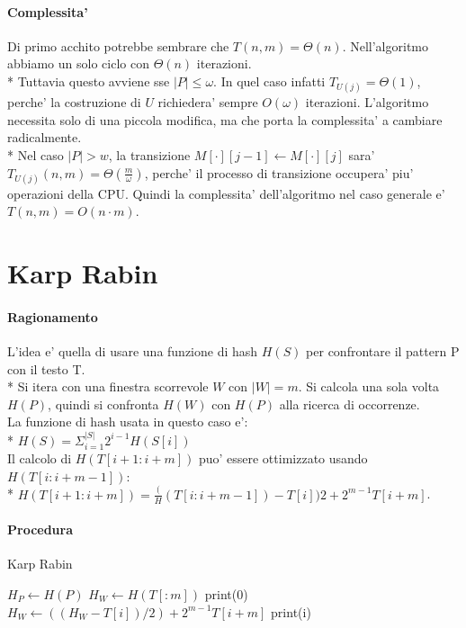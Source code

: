 \pagebreak

\paragraph{Complessita'}

Di primo acchito potrebbe sembrare che $T(n, m) = \Theta(n)$.
Nell'algoritmo abbiamo un solo ciclo con $\Theta(n)$ iterazioni. \\*
Tuttavia questo avviene sse $|P| \leq \omega$. In quel caso infatti $T_{U(j)} = \Theta(1)$, perche' la costruzione di $U$ richiedera' sempre $O(\omega)$ iterazioni. L'algoritmo necessita solo di una piccola modifica, ma che porta la complessita' a cambiare radicalmente. \\*
Nel caso $|P| > w$, la transizione $M[\cdot][j-1] \leftarrow M[\cdot][j]$ sara' $T_{U(j)}(n,m) = \Theta(\frac m \omega)$, perche' il processo di transizione occupera' piu' operazioni della CPU.
Quindi la complessita' dell'algoritmo nel caso generale e' $T(n,m) = O(n \cdot m)$.

\section{Karp Rabin}

\paragraph{Ragionamento}

L'idea e' quella di usare una funzione di hash $H(S)$ per confrontare il pattern P con il testo T. \\*
Si itera con una finestra scorrevole $W$ con $|W| = m$. Si calcola una sola volta $H(P)$, quindi si confronta $H(W)$ con $H(P)$ alla ricerca di occorrenze. \\

La funzione di hash usata in questo caso e': \\*
$H(S) = \Sigma_{i=1}^{|S|} 2^{i-1} H(S[i])$ \\

Il calcolo di $H(T[i+1:i+m])$ puo' essere ottimizzato usando $H(T[i:i+m-1])$: \\*
$H(T[i+1:i+m]) = \frac (H(T[i:i+m-1]) - T[i]) 2 + 2^{m-1}T[i+m]$.

\paragraph{Procedura}

\begin{algorithm}
   \renewcommand\thealgorithm{}
    \caption{Karp Rabin}
    \begin{algorithmic}
            \State $H_{P} \gets H(P)$
            \State $H_{W} \gets H(T[:m])$
                \State print(0)
            \EndIf
                \State $H_{W} \gets ((H_{W} - T[i]) / 2) + 2^{m-1}T[i+m]$
                    \State print(i)
                \EndIf
            \EndFor
        \EndProcedure
    \end{algorithmic}
\end{algorithm}

